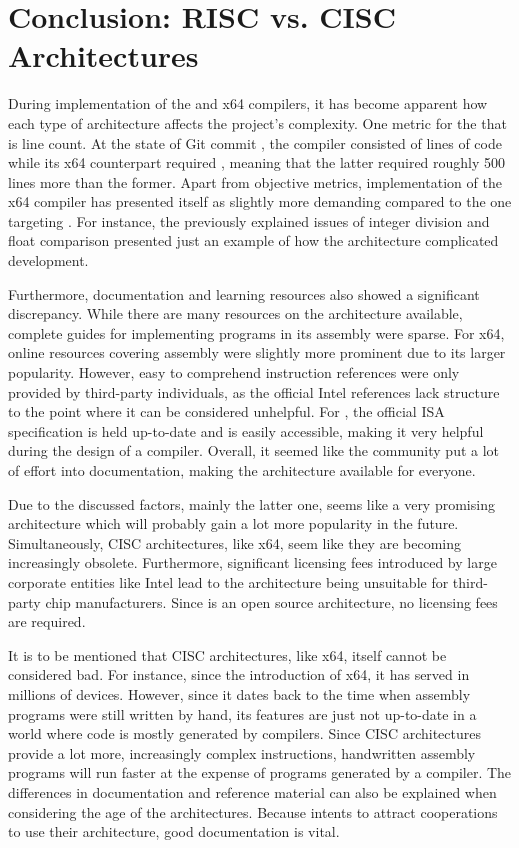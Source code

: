 \newpage
\section{Conclusion: RISC vs. CISC Architectures}

During implementation of the \riscv{} and x64 compilers, it has become apparent how each type of architecture affects the project's  complexity.
One metric for the that is line count.
At the state of Git commit \rushCommit{}, the \riscv{} compiler consisted of  lines of code while
its x64 counterpart required , meaning that the latter required roughly 500 lines more than the former.
Apart from objective metrics, implementation of the x64 compiler has presented itself as slightly more demanding compared to the one targeting \riscv{}.
For instance, the previously explained issues of integer division and float comparison presented just an example of how the architecture complicated development.

Furthermore, documentation and learning resources also showed a significant discrepancy.
While there are many resources on the \riscv{} architecture available,
complete guides for implementing programs in its assembly were sparse.
For x64, online resources covering assembly were slightly more prominent due to its larger popularity.
However, easy to comprehend instruction references were only provided by third-party individuals,
as the official Intel references lack structure to the point where it can be considered unhelpful.
For \riscv{}, the official ISA specification is held up-to-date and is easily accessible,
making it very helpful during the design of a compiler.
Overall, it seemed like the \riscv{} community put a lot of effort into documentation,
making the architecture available for everyone.

Due to the discussed factors, mainly the latter one,
\riscv{} seems like a very promising architecture which will probably gain a lot more popularity in the future.
Simultaneously, CISC architectures, like x64, seem like they are becoming increasingly obsolete.
Furthermore, significant licensing fees introduced by large corporate entities like Intel
lead to the architecture being unsuitable for third-party chip manufacturers.
Since \riscv{} is an open source architecture, no licensing fees are required.

It is to be mentioned that CISC architectures, like x64, itself cannot be considered bad.
For instance, since the introduction of x64, it has served in millions of devices.
However, since it dates back to the time when assembly programs were still written by hand,
its features are just not up-to-date in a world where code is mostly generated by compilers.
Since CISC architectures provide a lot more, increasingly complex instructions,
handwritten assembly programs will run faster at the expense of programs generated by a compiler.
The differences in documentation and reference material can also be explained when considering the age of the architectures.
Because \riscv{} intents to attract cooperations to use their architecture, good documentation is vital.

